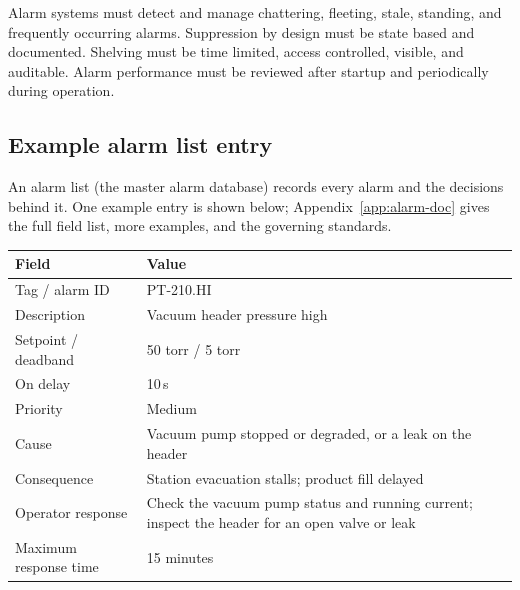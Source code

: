 Alarm systems must detect and manage chattering, fleeting, stale, standing, and frequently occurring alarms. Suppression by design must be state based and documented. Shelving must be time limited, access controlled, visible, and auditable. Alarm performance must be reviewed after startup and periodically during operation.

\subsection*{Example alarm list entry}
An alarm list (the master alarm database) records every alarm and the decisions behind it. One example entry is shown below; Appendix~\ref{app:alarm-doc} gives the full field list, more examples, and the governing standards.

\begin{center}
\begin{tabular}{@{}P{4.53cm}P{12.82cm}@{}}
\toprule
{}\textbf{Field} & \textbf{Value} \\
\midrule
Tag / alarm ID & PT-210.HI \\
Description & Vacuum header pressure high \\
Setpoint / deadband & 50 torr / 5 torr \\
On delay & 10\,s \\
Priority & Medium \\
Cause & Vacuum pump stopped or degraded, or a leak on the header \\
Consequence & Station evacuation stalls; product fill delayed \\
Operator response & Check the vacuum pump status and running current; inspect the header for an open valve or leak \\
Maximum response time & 15 minutes \\
\bottomrule
\end{tabular}
\end{center}
